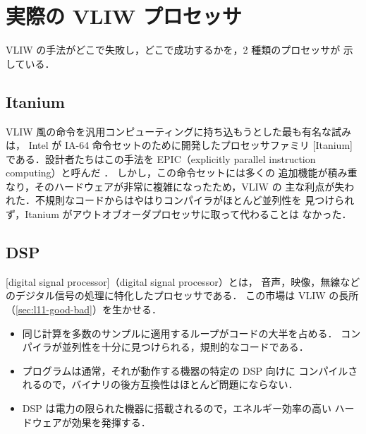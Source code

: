 \documentclass[../main.tex]{subfiles}
\begin{document}
\section{実際の VLIW プロセッサ}
\label{sec:l11-examples}

VLIW の手法がどこで失敗し，どこで成功するかを，2 種類のプロセッサが
示している．

\subsection{Itanium}
\label{sec:l11-itanium}

VLIW 風の命令を汎用コンピューティングに持ち込もうとした最も有名な試みは，
Intel が IA-64 命令セットのために開発したプロセッサファミリ
[Itanium]である．設計者たちはこの手法を EPIC（explicitly
parallel instruction computing）と呼んだ \cite{schlansker2000}．
しかし，この命令セットには多くの
追加機能が積み重なり，そのハードウェアが非常に複雑になったため，VLIW の
主な利点が失われた．不規則なコードからはやはりコンパイラがほとんど並列性を
見つけられず，Itanium がアウトオブオーダプロセッサに取って代わることは
なかった．

\subsection{DSP}
\label{sec:l11-dsp}

[digital signal processor]（digital signal processor）とは，
音声，映像，無線などのデジタル信号の処理に特化したプロセッサである．
この市場は VLIW の長所（\cref{sec:l11-good-bad}）を生かせる．
%
\begin{itemize}
  \item 同じ計算を多数のサンプルに適用するループがコードの大半を占める．
    コンパイラが並列性を十分に見つけられる，規則的なコードである．
  \item プログラムは通常，それが動作する機器の特定の DSP 向けに
    コンパイルされるので，バイナリの後方互換性はほとんど問題にならない．
  \item DSP は電力の限られた機器に搭載されるので，エネルギー効率の高い
    ハードウェアが効果を発揮する．
\end{itemize}
\end{document}
